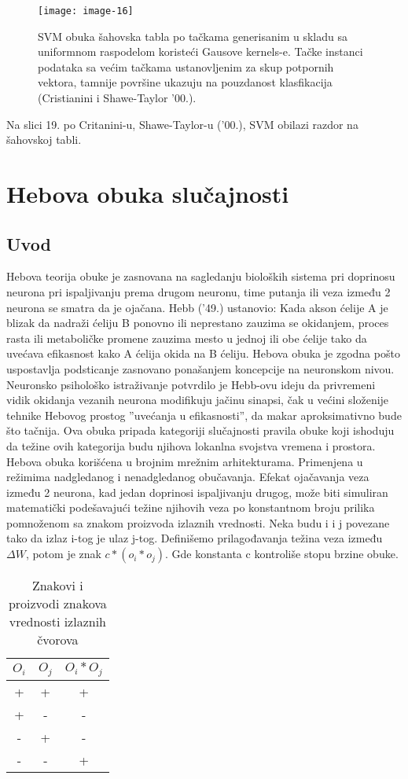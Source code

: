 \documentclass[fontsize=11bp, paper=a4]{scrarticle}
\begin{document}
\begin{figure}[h!]
    \centering
    \texttt{[image: image-16]}
    \caption{SVM obuka šahovska tabla po tačkama generisanim u skladu sa uniformnom raspodelom koristeći Gausove kernels-e. Tačke instanci podataka sa većim tačkama ustanovljenim za skup potpornih vektora, tamnije površine ukazuju na pouzdanost klasfikacija (Cristianini i Shawe-Taylor '00.).}
\end{figure}
Na slici 19. po Critanini-u, Shawe-Taylor-u ('00.), SVM obilazi razdor na šahovskoj tabli. 

\section{Hebova obuka slučajnosti}
\subsection{Uvod}
Hebova teorija obuke je zasnovana na sagledanju bioloških sistema pri doprinosu neurona pri ispaljivanju prema drugom neuronu, time putanja ili veza između 2 neurona se smatra da je ojačana. Hebb ('49.) ustanovio: Kada akson ćelije A je blizak da nadraži ćeliju B ponovno ili neprestano zauzima se okidanjem, proces rasta ili metaboličke promene zauzima mesto u jednoj ili obe ćelije tako da uvećava efikasnost kako A ćelija okida na B ćeliju. Hebova obuka je zgodna pošto uspostavlja podsticanje zasnovano ponašanjem koncepcije na neuronskom nivou. Neuronsko psihološko istraživanje potvrdilo je Hebb-ovu ideju da privremeni vidik okidanja vezanih neurona modifikuju jačinu sinapsi, čak u većini složenije tehnike Hebovog prostog ''uvećanja u efikasnosti'', da makar aproksimativno bude što tačnija. Ova obuka pripada kategoriji slučajnosti pravila obuke koji ishoduju da težine ovih kategorija budu njihova lokanlna svojstva vremena i prostora. Hebova obuka korišćena u brojnim mrežnim arhitekturama. Primenjena u režimima nadgledanog i nenadgledanog obučavanja. Efekat ojačavanja veza između 2 neurona, kad jedan doprinosi ispaljivanju drugog, može biti simuliran matematički podešavajući težine njihovih veza po konstantnom broju prilika pomnoženom sa znakom proizvoda izlaznih vrednosti. Neka budu i i j povezane tako da izlaz i-tog je ulaz j-tog. Definišemo prilagođavanja težina veza između $\Delta W$, potom je znak $c * (o_i*o_j)$. Gde konstanta c kontroliše stopu brzine obuke.
\begin{table}[h!]
    \centering
    \begin{tabular}{|c|c|c|}
    \hline    
    $O_i$ & $O_j$ & $O_i * O_j$ \\ \hline
        +& + & +  \\ \hline
        +& - & - \\ \hline
        -& + & - \\ \hline
        -& - & + \\ \hline
    \end{tabular}
    \caption{Znakovi i proizvodi znakova vrednosti izlaznih čvorova}
\end{table}
\end{document}
